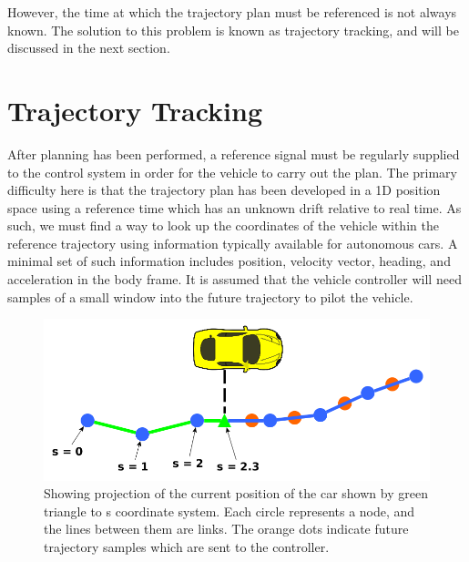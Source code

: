 \documentclass[letterpaper, 10 pt, conference]{ieeeconf}  %
\begin{document}

However, the time at which the trajectory plan must be referenced is not always known.
The solution to this problem is known as trajectory tracking, and will be discussed in the next section.



\section{Trajectory Tracking} \label{sec:trajectorytracking}

After planning has been performed, a reference signal must be regularly supplied to the control system in order for the vehicle to carry out the plan.
The primary difficulty here is that the trajectory plan has been developed in a 1D position space using a reference time which has an unknown drift relative to real time.
As such, we must find a way to look up the coordinates of the vehicle within the reference trajectory using information typically available for autonomous cars.
A minimal set of such information includes position, velocity vector, heading, and acceleration in the body frame.
It is assumed that the vehicle controller will need samples of a small window into the future trajectory to pilot the vehicle.

\begin{figure}[thpb]
  \centering
  \includegraphics[width=0.8\columnwidth]{graphics/PathProjectionSlice.png}
  \caption{Showing projection of the current position of the car shown by green triangle to s coordinate system. Each circle represents a node, and the lines between them are links. The orange dots indicate future trajectory samples which are sent to the controller.
  }

  \label{fig:cartos}
\end{figure}
\end{document}
